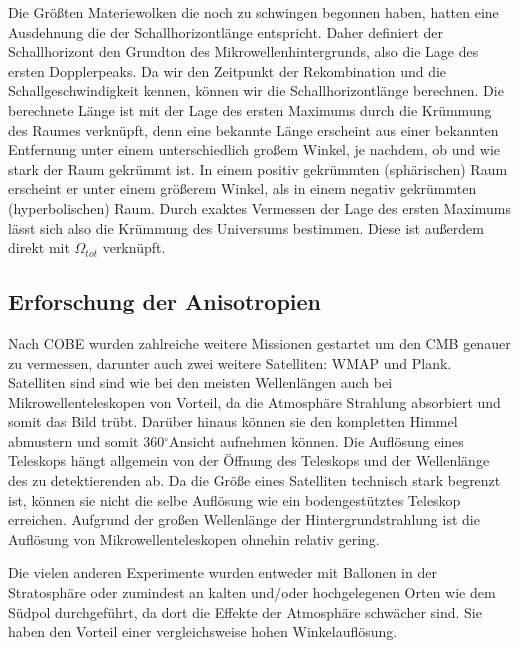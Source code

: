 \documentclass[10pt,a4paper]{article}
\newcommand{\degree}{$^\circ$}
\begin{document}
Die Größten Materiewolken die noch zu schwingen begonnen haben, hatten eine Ausdehnung die der Schallhorizontlänge entspricht. Daher definiert der Schallhorizont den Grundton des Mikrowellenhintergrunds, also die Lage des ersten Dopplerpeaks. Da wir den Zeitpunkt der Rekombination und die Schallgeschwindigkeit kennen, können wir die Schallhorizontlänge berechnen. Die berechnete Länge ist mit der Lage des ersten Maximums durch die Krümmung des Raumes verknüpft, denn eine bekannte Länge erscheint aus einer bekannten Entfernung unter einem unterschiedlich großem Winkel, je nachdem, ob und wie stark der Raum gekrümmt ist. In einem positiv gekrümmten (sphärischen) Raum erscheint er unter einem größerem Winkel, als in einem negativ gekrümmten (hyperbolischen) Raum. Durch exaktes Vermessen der Lage des ersten Maximums lässt sich also die Krümmung des Universums bestimmen. Diese ist außerdem direkt mit $\Omega_{tot}$ verknüpft.\cite{S+W03} %


\subsection{Erforschung der Anisotropien}\label{Missionen}
Nach COBE wurden zahlreiche weitere Missionen gestartet um den CMB genauer zu vermessen, darunter auch zwei weitere Satelliten: WMAP und Plank.
Satelliten sind sind wie bei den meisten Wellenlängen auch bei Mikrowellenteleskopen von Vorteil, da die Atmosphäre Strahlung absorbiert und somit das Bild trübt. Darüber hinaus können sie den kompletten Himmel abmustern und somit 360\degree Ansicht aufnehmen können. Die Auflösung eines Teleskops hängt allgemein von der Öffnung des Teleskops und der Wellenlänge des zu detektierenden ab. Da die Größe eines Satelliten technisch stark begrenzt ist, können sie nicht die selbe Auflösung wie ein bodengestütztes Teleskop erreichen. Aufgrund der großen Wellenlänge der Hintergrundstrahlung ist die Auflösung von Mikrowellenteleskopen ohnehin relativ gering.

Die vielen anderen Experimente wurden entweder mit Ballonen in der Stratosphäre oder zumindest an kalten und/oder hochgelegenen Orten wie dem Südpol durchgeführt, da dort die Effekte der Atmosphäre schwächer sind. Sie haben den Vorteil einer vergleichsweise hohen Winkelauflösung.
\end{document}
